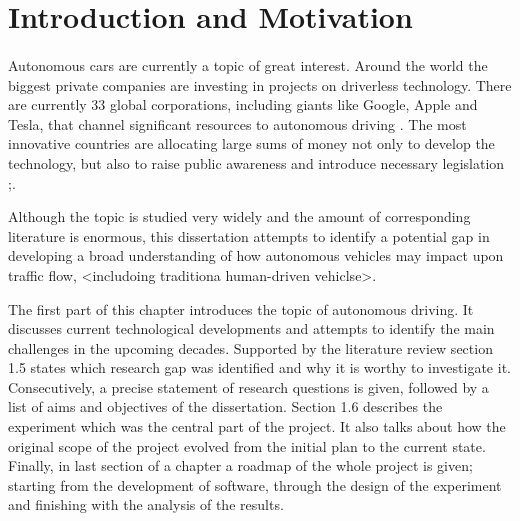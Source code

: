 \documentclass[11pt,english,twoside]{article}
\begin{document}
\newpage



\tableofcontents %


\newpage

\section{Introduction and Motivation} %

\paragraph{}
Autonomous cars are currently a topic of  great interest.  Around the world the biggest private companies are investing in projects on driverless technology. There are currently 33 global corporations, including giants like Google, Apple and Tesla, that channel significant resources to autonomous driving \citep{33comp}. The most innovative countries are allocating large sums of money not only to develop the technology, but also to raise public awareness and introduce necessary legislation \citep{pathwaytodriverless};\citep{pathwaytodriverless2}. 

\par
Although the topic is studied very widely and the amount of corresponding literature is enormous, this dissertation attempts to identify a potential gap in developing a broad understanding of how autonomous vehicles may impact upon traffic flow, <includoing traditiona human-driven vehiclse>. 



\par
The first part of this chapter introduces the topic of autonomous driving. It discusses current technological developments and attempts to identify the main challenges in the upcoming decades. Supported by the literature review section 1.5 states which research gap was identified and why it is worthy to investigate it. Consecutively, a precise statement of research questions is given, followed by a list of aims and objectives of the dissertation. Section 1.6 describes the experiment which was the central part of the project. It also talks about how the original scope of the project evolved from the initial plan to the current state. Finally, in last section of a chapter a roadmap of the whole project is given; starting from the development of software, through the design of the experiment and finishing with the analysis of the results.
\end{document}
